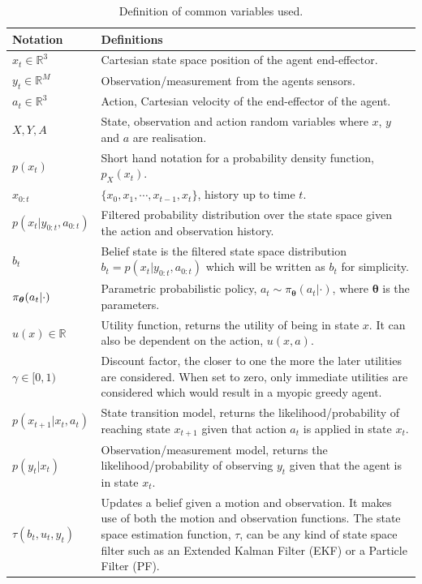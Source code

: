 \begin{table}
\begin{center}
\renewcommand{\arraystretch}{1.5}
\begin{tabular}{|l|p{9cm}|} 
\hline
    \textbf{Notation} 			 	& \textbf{Definitions} \\ \hline\hline
    $x_t \in \mathbb{R}^3$ 		 	& Cartesian state space position of the agent end-effector.\\
    $y_t \in \mathbb{R}^{M}$		 	& Observation/measurement from the agents sensors.\\
    $a_t \in \mathbb{R}^3$		 	& Action, Cartesian velocity of the end-effector of the agent.\\
    $X,Y,A$				 	& State, observation and action random variables where $x$, $y$ and $a$ are realisation.\\
    $p(x_t)$ 					& Short hand notation for a probability density function, $p_{X}(x_t)$.\\
    $x_{0:t}$					& $\{x_0,x_1,\cdots,x_{t-1},x_t\}$, history up to time $t$.\\
    $p(x_t|y_{0:t},a_{0:t})$	 		& Filtered probability distribution over the state space given the action and observation history.\\
    $b_t$					& Belief state is the filtered state space distribution
						 $b_t = p(x_t|y_{0:t},a_{0:t})$ which will be written as $b_t$ for simplicity.\\
    $\operatorname{\pi_{\boldsymbol{\theta}}}(a_t|\cdot)$ 			& Parametric probabilistic policy, $a_t \sim \pi_{\boldsymbol{\theta}}(a_t|\cdot)$, where $\boldsymbol{\theta}$ is the parameters.\\
    $u(x) \in \mathbb{R}$			& Utility function, returns the utility of being in state $x$. It can also be dependent on the action, $u(x,a)$.\\
    $\gamma \in [0,1)$				& Discount factor, the closer to one the more the later utilities are considered. When set to zero, only immediate utilities are 
						  considered which would result in a myopic greedy agent.\\
    $p(x_{t+1}|x_t,a_t)$			& State transition model, returns the likelihood/probability of reaching state $x_{t+1}$ given that action $a_t$ is applied in state $x_t$.\\	
    $p(y_t|x_t)$				& Observation/measurement model, returns the likelihood/probability of observing $y_t$ given that the agent is in state $x_t$.\\
    $\tau(b_{t},u_{t},y_t)$		& Updates a belief given a motion and observation. It makes use of both the motion and observation functions. The state space estimation function, $\tau$, can be any kind of state space filter such as an Extended Kalman Filter (EKF) or a Particle Filter (PF).
    \\ \hline
\end{tabular}
\end{center}
\caption{Definition of common variables used.}
\label{tab:notation}
\end{table}


